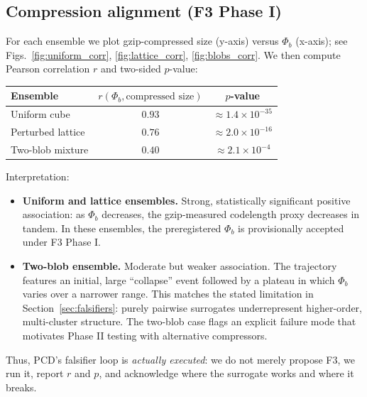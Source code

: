 \documentclass[11pt]{article}
\begin{document}
\subsection*{Compression alignment (F3 Phase I)}
For each ensemble we plot gzip-compressed size (y-axis) versus $\Phi_b$ (x-axis); see Figs.~\ref{fig:uniform_corr}, \ref{fig:lattice_corr}, \ref{fig:blobs_corr}.
We then compute Pearson correlation $r$ and two-sided $p$-value:

\begin{center}
\begin{tabular}{lcc}
\toprule
Ensemble & $r(\Phi_b,\text{compressed size})$ & $p$-value \\
\midrule
Uniform cube & $0.93$ & $\approx 1.4\times 10^{-35}$ \\
Perturbed lattice & $0.76$ & $\approx 2.0\times 10^{-16}$ \\
Two-blob mixture & $0.40$ & $\approx 2.1\times 10^{-4}$ \\
\bottomrule
\end{tabular}
\end{center}

Interpretation:
\begin{itemize}
    \item \textbf{Uniform and lattice ensembles.}
    Strong, statistically significant positive association: as $\Phi_b$ decreases, the gzip-measured codelength proxy decreases in tandem.
    In these ensembles, the preregistered $\Phi_b$ is provisionally accepted under F3 Phase I.
    \item \textbf{Two-blob ensemble.}
    Moderate but weaker association. The trajectory features an initial, large ``collapse'' event followed by a plateau in which $\Phi_b$ varies over a narrower range.
    This matches the stated limitation in Section~\ref{sec:falsifiers}: purely pairwise surrogates underrepresent higher-order, multi-cluster structure.
    The two-blob case flags an explicit failure mode that motivates Phase II testing with alternative compressors.
\end{itemize}

Thus, PCD's falsifier loop is \emph{actually executed}: we do not merely propose F3, we run it, report $r$ and $p$, and acknowledge where the surrogate works and where it breaks.
\end{document}
